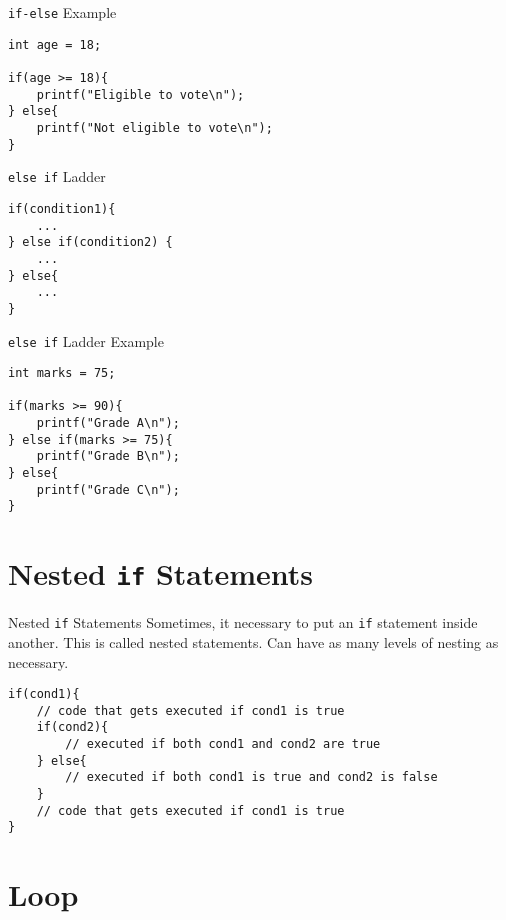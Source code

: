 \documentclass[12pt, aspectratio=169]{beamer}
\begin{document}
    \begin{frame}[fragile]{\texttt{if-else} Example}
        \begin{verbatim}
int age = 18;

if(age >= 18){
    printf("Eligible to vote\n");
} else{
    printf("Not eligible to vote\n");
}
        \end{verbatim}
    \end{frame}


    \begin{frame}[fragile]{\texttt{else if} Ladder}
        \begin{verbatim}
if(condition1){
    ...
} else if(condition2) {
    ...
} else{
    ...
}
        \end{verbatim}
    \end{frame}


    \begin{frame}[fragile]{\texttt{else if} Ladder Example}
        \begin{verbatim}
int marks = 75;

if(marks >= 90){
    printf("Grade A\n");
} else if(marks >= 75){
    printf("Grade B\n");
} else{
    printf("Grade C\n");
}
        \end{verbatim}
    \end{frame}


    \section{Nested \texttt{if} Statements}

    \begin{frame}[fragile]{Nested \texttt{if} Statements}
        Sometimes, it necessary to put an \texttt{if} statement inside another. This is called nested statements. Can have as many levels of nesting as necessary.

        \begin{verbatim}
if(cond1){
    // code that gets executed if cond1 is true
    if(cond2){
        // executed if both cond1 and cond2 are true
    } else{
        // executed if both cond1 is true and cond2 is false
    }
    // code that gets executed if cond1 is true
}
        \end{verbatim}
    \end{frame}


    \section{Loop}
\end{document}
